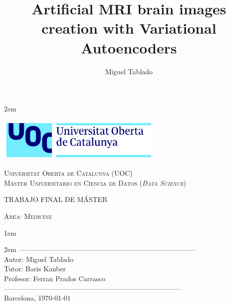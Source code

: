 \newpage
\thispagestyle{empty}

\baselineskip 2em


\centerline{\includegraphics[width=0.6\textwidth]{images/UOC-logo.png}}
\begin{center}
\textsc{Universitat Oberta de Catalunya (UOC) \\
 Máster Universitario en Ciencia de Datos (\textit{Data Science})\\}


\vspace*{1.5cm}

\textsc{\Large TRABAJO FINAL DE MÁSTER}

\vspace*{0.5cm}

\textsc{\large Area: Medicine}

\vspace*{2.0cm}

\title{\Large Artificial MRI brain images creation with Variational Autoencoders}

\vspace{2.5cm}
\baselineskip 1em

\baselineskip 2em
-----------------------------------------------------------------------------\\
Autor:      Miguel Tablado\\
Tutor:      Baris Kanber\\
Profesor:   Ferran Prados Carrasco\\
-----------------------------------------------------------------------------\\
\vspace*{1.5cm}
Barcelona, \today

\author{Miguel Tablado}

\end{center}
\hfill